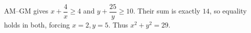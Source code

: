 AM--GM gives $x+\dfrac{4}{x}\ge4$ and $y+\dfrac{25}{y}\ge10$. Their sum is exactly $14$, so equality holds in both, forcing $x=2,y=5$. Thus $x^2+y^2=\boxed{29}$.
